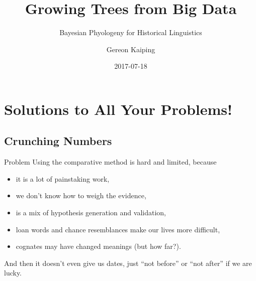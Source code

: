 \documentclass[9pt]{beamer}
\title{Growing Trees from Big Data}
\subtitle{Bayesian Phyologeny for Historical Linguistics}
\author{Gereon Kaiping}
\date{2017-07-18}
\begin{document}
\begin{frame}[plain]
  \titlepage
\end{frame}
\begin{frame}
  \tableofcontents
\end{frame}
\section{Solutions to All Your Problems!}
\subsection{Crunching Numbers}
\begin{frame}{Problem}
  Using the comparative method is hard and limited, because
  \begin{itemize}
  \item it is a lot of painstaking work,
  \item we don't know how to weigh the evidence,
  \item is a mix of hypothesis generation and validation,
  \item loan words and chance resemblances make our lives more difficult,
  \item cognates may have changed meanings (but how far?).
  \end{itemize}
  \pause
  And then it doesn't even give us dates, just “not before” or “not after” if we are lucky.
\end{frame}
\end{document}
